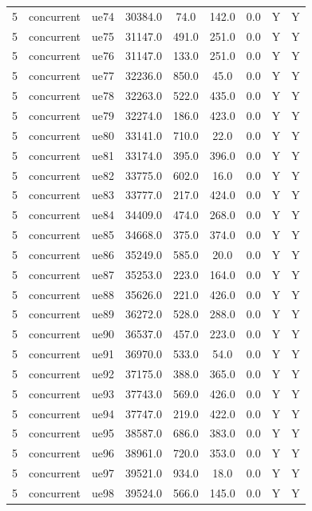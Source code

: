 \begin{table}[ht]
\begin{tabular}{|c|c|c|c|c|c|c|c|c|}
5 & concurrent & ue74 & 30384.0 & 74.0 & 142.0 & 0.0 & Y & Y \\
5 & concurrent & ue75 & 31147.0 & 491.0 & 251.0 & 0.0 & Y & Y \\
5 & concurrent & ue76 & 31147.0 & 133.0 & 251.0 & 0.0 & Y & Y \\
5 & concurrent & ue77 & 32236.0 & 850.0 & 45.0 & 0.0 & Y & Y \\
5 & concurrent & ue78 & 32263.0 & 522.0 & 435.0 & 0.0 & Y & Y \\
5 & concurrent & ue79 & 32274.0 & 186.0 & 423.0 & 0.0 & Y & Y \\
5 & concurrent & ue80 & 33141.0 & 710.0 & 22.0 & 0.0 & Y & Y \\
5 & concurrent & ue81 & 33174.0 & 395.0 & 396.0 & 0.0 & Y & Y \\
5 & concurrent & ue82 & 33775.0 & 602.0 & 16.0 & 0.0 & Y & Y \\
5 & concurrent & ue83 & 33777.0 & 217.0 & 424.0 & 0.0 & Y & Y \\
5 & concurrent & ue84 & 34409.0 & 474.0 & 268.0 & 0.0 & Y & Y \\
5 & concurrent & ue85 & 34668.0 & 375.0 & 374.0 & 0.0 & Y & Y \\
5 & concurrent & ue86 & 35249.0 & 585.0 & 20.0 & 0.0 & Y & Y \\
5 & concurrent & ue87 & 35253.0 & 223.0 & 164.0 & 0.0 & Y & Y \\
5 & concurrent & ue88 & 35626.0 & 221.0 & 426.0 & 0.0 & Y & Y \\
5 & concurrent & ue89 & 36272.0 & 528.0 & 288.0 & 0.0 & Y & Y \\
5 & concurrent & ue90 & 36537.0 & 457.0 & 223.0 & 0.0 & Y & Y \\
5 & concurrent & ue91 & 36970.0 & 533.0 & 54.0 & 0.0 & Y & Y \\
5 & concurrent & ue92 & 37175.0 & 388.0 & 365.0 & 0.0 & Y & Y \\
5 & concurrent & ue93 & 37743.0 & 569.0 & 426.0 & 0.0 & Y & Y \\
5 & concurrent & ue94 & 37747.0 & 219.0 & 422.0 & 0.0 & Y & Y \\
5 & concurrent & ue95 & 38587.0 & 686.0 & 383.0 & 0.0 & Y & Y \\
5 & concurrent & ue96 & 38961.0 & 720.0 & 353.0 & 0.0 & Y & Y \\
5 & concurrent & ue97 & 39521.0 & 934.0 & 18.0 & 0.0 & Y & Y \\
5 & concurrent & ue98 & 39524.0 & 566.0 & 145.0 & 0.0 & Y & Y \\

\end{tabular}
\end{table}
